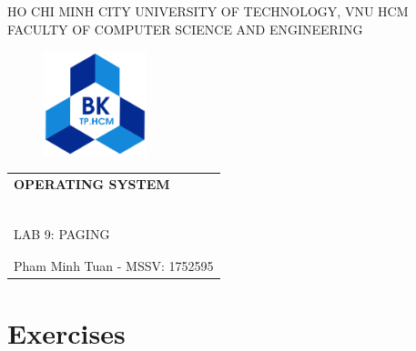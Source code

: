 \documentclass[a4paper, 11pt]{article}
\begin{document}
    \begin{titlepage}
        \begin{center}
            HO CHI MINH CITY UNIVERSITY OF TECHNOLOGY, VNU HCM \\
            FACULTY OF COMPUTER SCIENCE AND ENGINEERING
        \end{center}

        \vspace{1cm}

        \begin{figure}[h!]
            \begin{center}
                \includegraphics[width=3cm]{hcmut.png}
            \end{center}
        \end{figure}

        \vspace{1cm}

        \begin{center}
            \begin{tabular}{c}
                \multicolumn{1}{l}{\textbf{\LARGE OPERATING SYSTEM}} \\
                ~~\\
                \hline
                \\
                \multicolumn{1}{l}{\LARGE LAB 9: PAGING} \\
                \\
                \hline
                \\
                \hspace{5cm} Pham Minh Tuan - MSSV: 1752595
            \end{tabular}
        \end{center}
    \end{titlepage}

\newpage

\renewcommand*\contentsname{Contents:}
\tableofcontents

\newpage

\section{Exercises}
\end{document}
